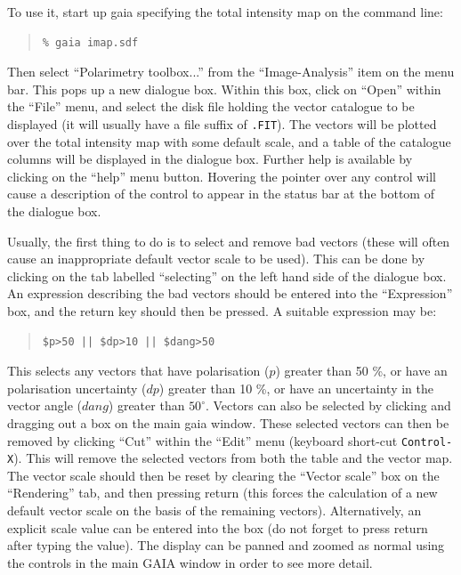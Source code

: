 \documentclass[twoside,11pt]{starlink}
\begin{document}
To use it, start up gaia specifying the total intensity map on the
command line:

\begin{quote}
\begin{verbatim}
% gaia imap.sdf
\end{verbatim}
\end{quote}

Then select ``Polarimetry toolbox...'' from the ``Image-Analysis'' item
on the menu bar. This pops up a new dialogue box. Within this box, click
on ``Open'' within the ``File'' menu, and select the disk file holding
the vector catalogue to be displayed (it will usually have a file suffix
of \texttt{.FIT}). The vectors will be plotted over the total intensity
map with some default scale, and a table of the catalogue columns will be
displayed in the dialogue box. Further help is available by clicking on
the ``help'' menu button. Hovering the pointer over any control will
cause a description of the control to appear in the status bar at the
bottom of the dialogue box.

Usually, the first thing to do is to select and remove bad vectors (these
will often cause an inappropriate default vector scale to be used). This
can be done by clicking on the tab labelled ``selecting'' on the left
hand side of the dialogue box. An expression describing the bad vectors
should be entered into the ``Expression'' box, and the return key should
then be pressed. A suitable expression may be:

\begin{quote}
\begin{verbatim}
$p>50 || $dp>10 || $dang>50
\end{verbatim}
\end{quote}

This selects any vectors that have polarisation ($p$) greater than 50
\%, or have an polarisation uncertainty ($dp$) greater than 10 \%, or have an
uncertainty in the vector angle ($dang$) greater than $50^{\circ}$.
Vectors can also be selected by clicking and dragging out a box on the
main gaia window. These selected vectors can then be removed by clicking
``Cut'' within the ``Edit'' menu (keyboard short-cut \texttt{Control-X}).
This will remove the selected vectors from both the table and the vector
map. The vector scale should then be reset by clearing the ``Vector
scale'' box on the ``Rendering'' tab, and then pressing return (this
forces the calculation of a new default vector scale on the basis of the
remaining vectors). Alternatively, an explicit scale value can be entered
into the box (do not forget to press return after typing the value). The
display can be panned and zoomed as normal using the controls in the main
GAIA window in order to see more detail.
\end{document}
